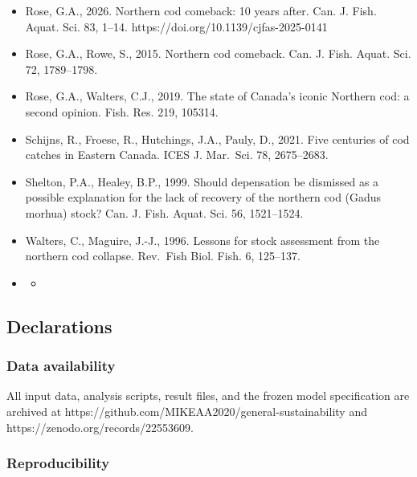 \documentclass[11pt]{article}
\providecommand{\tightlist}{\setlength{\itemsep}{0.2em}\setlength{\parskip}{0pt}}
\begin{document}
\begin{itemize}
  NAFO Divisions 2J3KL in 2024. DFO Can. Sci. Advis. Sec. Res. Doc.
  2025/048.
\item
  Rose, G.A., 2026. Northern cod comeback: 10 years after. Can. J. Fish.
  Aquat. Sci. 83, 1--14. https://doi.org/10.1139/cjfas-2025-0141
\item
  Rose, G.A., Rowe, S., 2015. Northern cod comeback. Can. J. Fish.
  Aquat. Sci. 72, 1789--1798.
\item
  Rose, G.A., Walters, C.J., 2019. The state of Canada's iconic Northern
  cod: a second opinion. Fish. Res. 219, 105314.
\item
  Schijns, R., Froese, R., Hutchings, J.A., Pauly, D., 2021. Five
  centuries of cod catches in Eastern Canada. ICES J. Mar.~Sci. 78,
  2675--2683.
\item
  Shelton, P.A., Healey, B.P., 1999. Should depensation be dismissed as
  a possible explanation for the lack of recovery of the northern cod
  (Gadus morhua) stock? Can. J. Fish. Aquat. Sci. 56, 1521--1524.
\item
  Walters, C., Maguire, J.-J., 1996. Lessons for stock assessment from
  the northern cod collapse. Rev.~Fish Biol. Fish. 6, 125--137.
\item
  \begin{itemize}
  \tightlist
  \item
  \end{itemize}
\end{itemize}

\subsection{Declarations}\label{declarations}

\subsubsection{Data availability}\label{data-availability}

All input data, analysis scripts, result files, and the frozen model
specification are archived at
https://github.com/MIKEAA2020/general-sustainability and
https://zenodo.org/records/22553609.

\subsubsection{Reproducibility}\label{reproducibility}
\end{document}
